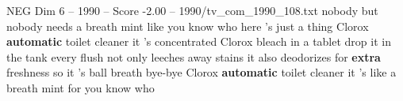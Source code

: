 \begin{textsample}{NEG Dim 6 – 1990 – Score -2.00 – 1990/tv\_com\_1990\_108.txt}  \label{ex:f6_neg_024}
nobody but nobody needs a breath mint like you know who here 's just a thing Clorox \textbf{automatic} toilet cleaner it 's concentrated Clorox bleach in a tablet drop it in the tank every flush not only leeches away stains it also deodorizes for \textbf{extra} freshness so it 's ball breath bye-bye Clorox \textbf{automatic} toilet cleaner it 's like a breath mint for you know who

\end{textsample}
